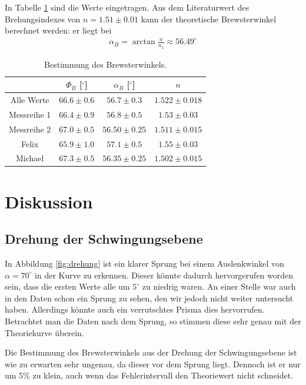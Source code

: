 \documentclass[12pt,a4paper,titlepage,headinclude,bibtotoc]{scrartcl}
\begin{document}
In Tabelle \ref{tab:brewster} sind die Werte eingetragen.
Aus dem Literaturwert des Brehungsindexes von $n=1.51\pm 0.01$ kann der theoretische Brewsterwinkel berechnet werden: er liegt bei
\begin{align}
	\alpha_B=\arctan \frac{n}{n_1}\approx 56.49^\circ
\end{align}
\begin{table}[!htb]
\centering
\begin{tabular}{|c|c|c|c|}
         \hline
         & $\Phi_B$ [$^\circ$] & $\alpha_B$ [$^\circ$] & $n$ \\
         \hline
         Alle Werte & $66.6 \pm 0.6$ & $56.7 \pm 0.3$ & $1.522 \pm 0.018$ \\
         Messreihe 1& $66.4 \pm 0.9$ & $56.8 \pm 0.5$ & $1.53 \pm 0.03$ \\
         Messreihe 2& $67.0 \pm 0.5$ & $56.50 \pm 0.25$ & $1.511 \pm 0.015$ \\
         \hline
         Felix & $65.9 \pm 1.0$ & $57.1 \pm 0.5$ & $1.55 \pm 0.03$ \\
         Michael & $67.3 \pm 0.5$ & $56.35 \pm 0.25$ & $1.502 \pm 0.015$ \\
         \hline
\end{tabular}
\caption{Bestimmung des Brewsterwinkels.}
\label{tab:brewster}
\end{table}



\section{Diskussion}
\label{sec:diskussion}
\subsection{Drehung der Schwingungsebene}
In Abbildung \ref{fig:drehung} ist ein klarer Sprung bei einem Auslenkwinkel von $\alpha=70^\circ$ in der Kurve zu erkennen.
Dieser könnte dadurch hervorgerufen worden sein, dass die ersten Werte alle um $5^\circ$ zu niedrig waren.
An einer Stelle war auch in den Daten schon ein Sprung zu sehen, den wir jedoch nicht weiter untersucht haben.
Allerdings könnte auch ein verrutschtes Prisma dies hervorrufen.
Betrachtet man die Daten nach dem Sprung, so stimmen diese sehr genau mit der Theoriekurve überein.

Die Bestimmung des Brewsterwinkels aus der Drehung der Schwingungsebene ist wie zu erwarten sehr ungenau, da dieser vor dem Sprung liegt.
Dennoch ist er nur um 5\% zu klein, auch wenn das Fehlerintervall den Theoriewert nicht schneidet.
\end{document}
